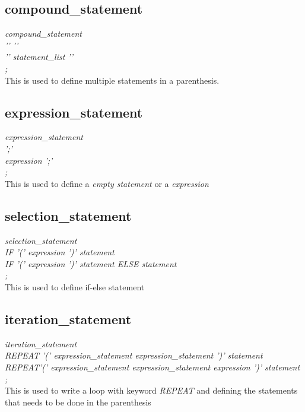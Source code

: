 \documentclass[11pt]{article}
\begin{document}
\subsection{compound\_statement}
{\itshape
compound\_statement\\
\hspace*{1cm} '{' '}'\\
\hspace*{1cm}   '{' statement\_list '}'\\
\hspace*{1cm};\\
}
This is used to define multiple statements in a parenthesis.
\subsection{expression\_statement}
{\itshape
expression\_statement\\
\hspace*{1cm} ';'\\
\hspace*{1cm}   expression ';'\\
\hspace*{1cm};\\
}
This is used to define a \textit{empty statement} or a \textit{expression}
\subsection{selection\_statement}
{\itshape
selection\_statement\\
\hspace*{1cm} IF '(' expression ')' statement \\
\hspace*{1cm}   IF '(' expression ')' statement ELSE statement\\
\hspace*{1cm};\\
}
This is used to define if-else statement
\subsection{iteration\_statement}
{\itshape
iteration\_statement\\
\hspace*{1cm} REPEAT '(' expression\_statement expression\_statement ')' statement\\
\hspace*{1cm}   REPEAT'(' expression\_statement expression\_statement expression ')' statement\\
\hspace*{1cm};\\
}
This is used to write a loop with keyword \textit{REPEAT} and defining the statements that needs to be done in the parenthesis
\end{document}
